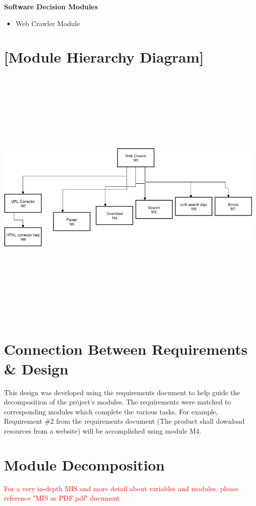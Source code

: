 \documentclass[titlepage]{article}
\newcommand{\group}[1]{{\leavevmode\color{red}[#1]}}
\begin{document}
\textbf{Software Decision Modules}

\begin{itemize}
\item{Web Crawler Module}\\
\end{itemize}



\section{\group{Module Hierarchy Diagram}}
\includegraphics[width=19cm, height=13cm]{Hierarchy}


\section{Connection Between Requirements \& Design}

This design was developed using the requirements document to help guide the decomposition of the project's modules. The requirements were matched to corresponding modules which complete the various tasks. For example, Requirement \#2 from the requirements document (The product shall download resources from a website) will be accomplished using module M4.


\section{Module Decomposition}
\textcolor{red}{For a very in-depth MIS and more detail about variables and modules, please reference "MIS as PDF.pdf" document}
\end{document}
